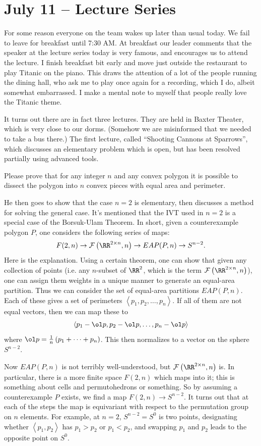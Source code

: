\documentclass[11pt]{scrreprt}
\numberwithin{figure}{chapter}
\begin{document}
\section{July 11 -- Lecture Series}
For some reason everyone on the team wakes up later than usual today.
We fail to leave for breakfast until 7:30 AM.
At breakfast our leader comments that the speaker at the lecture series today is very famous, and
encourages us to attend the lecture.
I finish breakfast bit early and move just outside the restaurant to play Titanic on the piano.
This draws the attention of a lot of the people running the dining hall, who ask me to play
once again for a recording, which I do, albeit somewhat embarrassed.
I make a mental note to myself that people really love the Titanic theme.

It turns out there are in fact three lectures.
They are held in Baxter Theater, which is very close to our dorms.
(Somehow we are misinformed that we needed to take a bus there.)
The first lecture, called ``Shooting Cannons at Sparrows'', which discusses an elementary problem
which is open, but has been resolved partially using advanced tools.
\begin{problem*}
  Please prove that for any integer $n$ and any convex polygon it is possible
  to dissect the polygon into $n$ convex pieces with equal area and perimeter.
\end{problem*}
He then goes to show that the case $n=2$ is elementary, then discusses a method for solving the general case.
It's mentioned that the IVT used in $n=2$ is a special case of the Borsuk-Ulam Theorem.
In short, given a counterexample polygon $P$, one considers the following series of maps:
\[  F(2,n)
  \to \mathcal F \left( \RR^{2 \times n}, n \right)
  \to EAP(P, n)
  \to S^{n-2}. \]
Here is the explanation.
Using a certain theorem, one can show that given any collection of points (i.e. any
$n$-subset of $\RR^2$, which is the term $\mathcal F \left( \RR^{2 \times n}, n \right)$), one can
assign them weights in a unique manner to generate an equal-area partition.
Thus we can consider the set of equal-area partitions $EAP(P, n)$.
Each of these gives a set of perimeters $\left< p_1, p_2, \dots, p_n\right>$.
If all of them are not equal vectors, then we can map these to
\[ \left< p_1 - \ol p, p_2 - \ol p, \dots, p_n - \ol p \right> \]
where $\ol p = \frac 1n \left( p_1 + \dots + p_n \right)$. This then normalizes to a vector on the sphere $S^{n-2}$.

Now $EAP(P,n)$ is not terribly well-understood, but $\mathcal F \left( \RR^{2 \times n}, n \right)$ is.
In particular, there is a more finite space $F(2,n)$ which maps into it; this is something about cells and permutohedrons or something.
So by assuming a counterexample $P$ exists, we find a map $F(2,n) \to S^{n-2}$.
It turns out that at each of the steps the map is equivariant with respect to the permutation group on $n$ elements.
For example, at $n=2$, $S^{n-2} = S^0$ is two points, designating whether $\left<p_1,p_2\right>$ has $p_1>p_2$ or $p_1<p_2$,
and swapping $p_1$ and $p_2$ leads to the opposite point on $S^0$.
\end{document}
